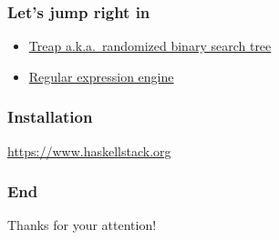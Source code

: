 \documentclass[pdf,aspectratio=169]{beamer}
\begin{document}
\begin{frame}
  \frametitle{Let's jump right in}
  \pause
  \begin{itemize}
    \item \href{https://gist.github.com/artemohanjanyan/a76faddf75e325dd04624680e89bd93b}
      {Treap a.k.a.\ randomized binary search tree}
    \item \href{https://github.com/LvivHaskell/simple-regex}
      {Regular expression engine}
  \end{itemize}
\end{frame}

\begin{frame}
  \frametitle{Installation}
  \center
  \url{https://www.haskellstack.org}
\end{frame}

\begin{frame}
  \frametitle{End}
  \pause
  \center
  Thanks for your attention!
\end{frame}
\end{document}
